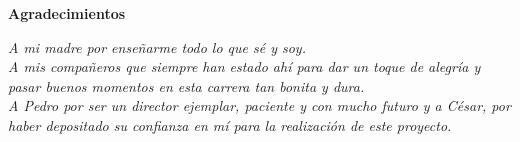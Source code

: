 \pagestyle{empty}
\topmargin=0cm

\begin{flushright}

\begin{Huge}
\textbf{Agradecimientos}
\end{Huge}

\vspace*{1cm}

\textit{A mi madre por enseñarme todo lo que sé y soy.}
\\[0.5cm]
\textit{A mis compañeros que siempre han estado ahí para dar un toque de alegría y pasar buenos momentos en esta carrera tan bonita y dura.}
\\[0.5cm]
\textit{A Pedro por ser un director ejemplar, paciente y con mucho futuro y a César, por haber depositado su confianza en mí para la realización de este proyecto.}

\end{flushright}